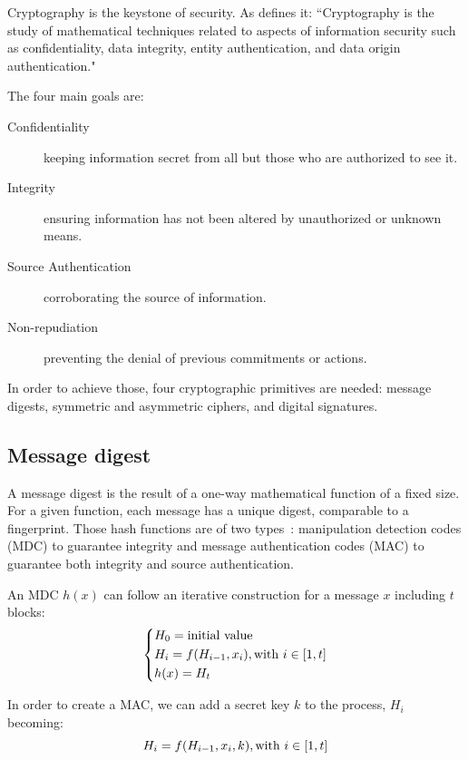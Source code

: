 Cryptography is the keystone of security. As \citet{Menezes1996} defines it: ``Cryptography is the study of mathematical techniques related to aspects of information security such as confidentiality, data integrity, entity authentication, and data origin authentication."

The four main goals are:
\begin{description}
	\item[Confidentiality] keeping information secret from all but those who are authorized to see it.
	\item[Integrity] ensuring information has not been altered by unauthorized or unknown means.
	\item[Source Authentication] corroborating the source of information.
	\item[Non-repudiation] preventing the denial of previous commitments or actions.
\end{description}

In order to achieve those, four cryptographic primitives are needed: message digests, symmetric and asymmetric ciphers, and digital signatures.








\subsection{Message digest}
A message digest is the result of a one-way mathematical function of a fixed size.
For a given function, each message has a unique digest, comparable to a fingerprint.
Those hash functions are of two types~\cite{infof405}: manipulation detection codes (MDC) to guarantee integrity and message authentication codes (MAC) to guarantee both integrity and source authentication.


An MDC $h(x)$ can follow an iterative construction for a message $x$ including $t$ blocks:
\[
\begin{dcases}
	H_0 = \mbox{initial value}\\
	H_i = f(H_{i-1}, x_i), \mbox{with } i \in [1,t]\\
	h(x) = H_t\\
\end{dcases}
\]

In order to create a MAC, we can add a secret key $k$ to the process, $H_i$ becoming:
\[
	H_i = f(H_{i-1}, x_i, k), \mbox{with } i \in [1,t]\\
\]

